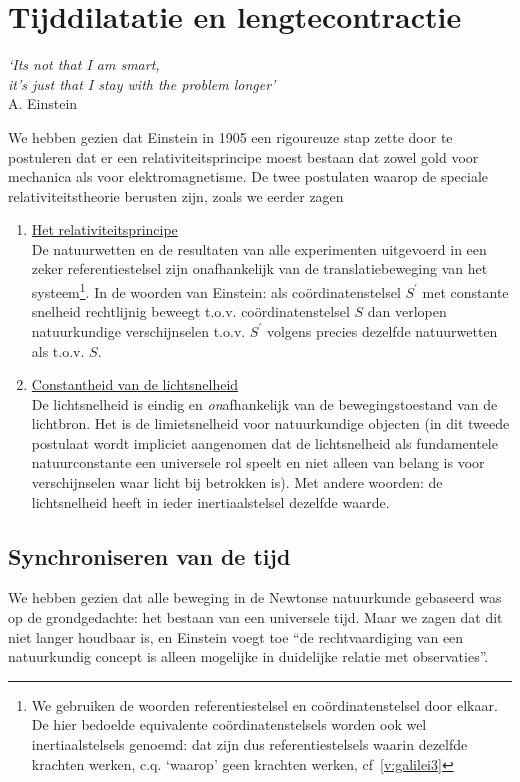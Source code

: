 \chapter{Tijddilatatie en lengtecontractie}
\vspace{-1cm}\begin{flushright}
{\it `Its not that I am smart, \\it's just that I stay with the problem longer'}\\ A. Einstein
\end{flushright}

We hebben gezien dat Einstein in 1905 een rigoureuze stap zette 
door te postuleren dat er een relativiteitsprincipe moest bestaan dat zowel gold voor
mechanica als voor elektromagnetisme. De twee postulaten waarop de speciale relativiteitstheorie berusten zijn, zoals we eerder zagen
\begin{enumerate}
\item \underline{Het relativiteitsprincipe}\\ De natuurwetten en de
resultaten van alle experimenten uitgevoerd in een zeker
referentiestelsel zijn onafhankelijk van de translatiebeweging van het
systeem\footnote{We gebruiken de woorden referentiestelsel en
co\"{o}rdinatenstelsel door elkaar. De hier bedoelde equivalente
co\"{o}rdinatenstelsels worden ook wel inertiaalstelsels genoemd: dat
zijn dus referentiestelsels waarin dezelfde krachten werken,
c.q. `waarop' geen krachten werken, cf~\ref{v:galilei3}}.  In de
woorden van Einstein: als co\"{o}rdinatenstelsel $S^{'}$ met constante
snelheid rechtlijnig beweegt t.o.v. co\"{o}rdinatenstelsel $S$ dan
verlopen natuurkundige verschijnselen t.o.v. $S^{'}$ volgens precies
dezelfde natuurwetten als t.o.v. $S$.
\item \underline{Constantheid van de lichtsnelheid}\\ De lichtsnelheid
is eindig en {\sl on}afhankelijk van de bewegingstoestand van de lichtbron.
Het is de limietsnelheid voor natuurkundige objecten (in dit tweede
postulaat wordt impliciet aangenomen dat de lichtsnelheid als
fundamentele natuurconstante een universele rol speelt en niet alleen
van belang is voor verschijnselen waar licht bij betrokken is). Met
andere woorden: de lichtsnelheid heeft in ieder inertiaalstelsel
dezelfde waarde.

\end{enumerate}

\section{Synchroniseren van de tijd}
We hebben gezien dat alle beweging in de Newtonse
natuurkunde gebaseerd was op de grondgedachte: het bestaan van een
universele tijd. Maar we zagen dat dit niet langer houdbaar is, en
Einstein voegt toe ``de rechtvaardiging van een natuurkundig concept
is alleen mogelijke in duidelijke relatie met observaties''. 

